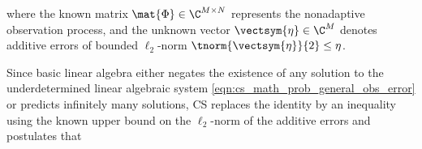 where
the known matrix
$\mat{\Phi} \in \C^{ M \times N }$ represents
the nonadaptive observation process, and
the unknown vector
$\vectsym{\eta} \in \C^{ M }$ denotes
additive errors of
bounded $\ell_{2}$-norm
$\tnorm{ \vectsym{\eta} }{2} \leq \eta$.

Since
basic linear algebra either negates
the existence of
any solution to
the underdetermined linear algebraic system
\eqref{eqn:cs_math_prob_general_obs_error} or predicts
infinitely many solutions,
\ac{CS} replaces
the identity by
an inequality using
the known upper bound on
the $\ell_{2}$-norm of
the additive errors and postulates that
